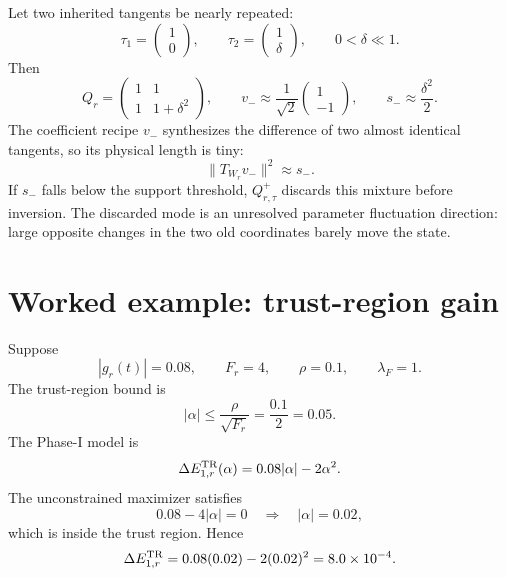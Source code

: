 \documentclass[10pt,twocolumn]{article}
\begin{document}
Let two inherited tangents be nearly repeated:
\begin{equation}
\tau_1=\begin{pmatrix}1\\0\end{pmatrix},
\qquad
\tau_2=\begin{pmatrix}1\\\delta\end{pmatrix},
\qquad 0<\delta\ll1.
\end{equation}
Then
\begin{equation}
Q_r=\begin{pmatrix}1&1\\1&1+\delta^2\end{pmatrix},
\qquad
v_-\approx\frac1{\sqrt2}\begin{pmatrix}1\\-1\end{pmatrix},
\qquad
s_-\approx\frac{\delta^2}{2}.
\end{equation}
The coefficient recipe \(v_-\) synthesizes the difference of two almost identical tangents, so its physical length is tiny:
\begin{equation}
\|T_{W_r}v_-\|^2\approx s_-.
\end{equation}
If \(s_-\) falls below the support threshold, \(Q_{r,\tau}^+\) discards this mixture before inversion. The discarded mode is an unresolved parameter fluctuation direction: large opposite changes in the two old coordinates barely move the state.

\section{Worked example: trust-region gain}

Suppose
\begin{equation}
|g_r(t)|=0.08,\qquad
F_r=4,\qquad
\rho=0.1,\qquad
\lambda_F=1.
\end{equation}
The trust-region bound is
\begin{equation}
|\alpha|\le\frac{\rho}{\sqrt{F_r}}=\frac{0.1}{2}=0.05.
\end{equation}
The Phase-I model is
\begin{equation}
\Delta E_{1,r}^{\rm TR}(\alpha)
=0.08|\alpha|-2\alpha^2.
\end{equation}
The unconstrained maximizer satisfies
\begin{equation}
0.08-4|\alpha|=0
\quad\Longrightarrow\quad
|\alpha|=0.02,
\end{equation}
which is inside the trust region. Hence
\begin{equation}
\Delta E_{1,r}^{\rm TR}=0.08(0.02)-2(0.02)^2=8.0\times10^{-4}.
\end{equation}
\end{document}
